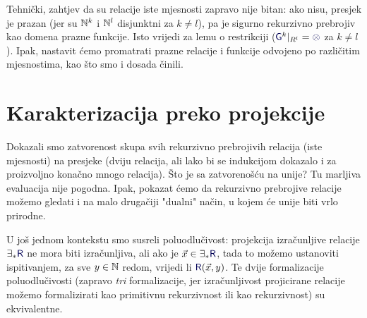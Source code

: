 Tehnički, zahtjev da su relacije iste mjesnosti zapravo nije bitan: ako nisu, presjek je prazan (jer su ${\mathbb N}^k$ i ${\mathbb N}^l$ disjunktni za $k\ne l$), pa je sigurno rekurzivno prebrojiv kao domena prazne funkcije. Isto vrijedi za lemu o restrikciji ($\f G^k|_{R^l}=\varnothing$ za $k\ne l$). Ipak, nastavit ćemo promatrati prazne relacije i funkcije odvojeno po različitim mjesnostima, kao što smo i dosada činili.


\section{Karakterizacija preko projekcije}

Dokazali smo zatvorenost skupa svih rekurzivno prebrojivih relacija (iste mjesnosti) na presjeke (dviju relacija, ali lako bi se indukcijom dokazalo i za proizvoljno konačno mnogo relacija). Što je sa zatvorenošću na unije? Tu marljiva evaluacija nije pogodna. Ipak, pokazat ćemo da rekurzivno prebrojive relacije možemo gledati i na malo drugačiji "dualni" način, u kojem će unije biti vrlo prirodne.

U još jednom kontekstu smo susreli poluodlučivost: projekcija izračunljive relacije $\exists_*\f R$ ne mora biti izračunljiva, ali ako je $\vec x\in\exists_*\f R$, tada to možemo ustanoviti ispitivanjem, za sve $y\in{\mathbb N}$ redom, vrijedi li $\f R(\vec x,y)$. Te dvije formalizacije poluodlučivosti (zapravo \emph{tri} formalizacije, jer izračunljivost projicirane relacije možemo formalizirati kao primitivnu rekurzivnost ili kao rekurzivnost) su ekvivalentne.

